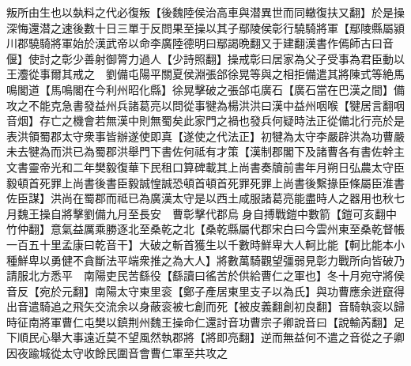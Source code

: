 叛所由生也以埶料之代必復叛【後魏陸侯治高車與潜異世而同轍復扶又翻】於是操深悔還潜之速後數十日三單于反問果至操以其子鄢陵侯彰行驍騎將軍【鄢陵縣屬潁川郡驍騎將軍始於漢武帝以命李廣陸德明曰鄢謁晩翻又于建翻漢書作傿師古曰音偃】使討之彰少善射御膂力過人【少詩照翻】操戒彰曰居家為父子受事為君臣動以王灋從事爾其戒之　劉備屯陽平關夏侯淵張郃徐晃等與之相拒備遣其將陳式等絶馬鳴閣道【馬鳴閣在今利州昭化縣】徐晃擊破之張郃屯廣石【廣石當在巴漢之間】備攻之不能克急書發益州兵諸葛亮以問從事犍為楊洪洪曰漢中益州咽喉【犍居言翻咽音烟】存亡之機會若無漢中則無蜀矣此家門之禍也發兵何疑時法正從備北行亮於是表洪領蜀郡太守衆事皆辦遂使即真【遂使之代法正】初犍為太守李嚴辟洪為功曹嚴未去犍為而洪已為蜀郡洪舉門下書佐何祗有才策【漢制郡閣下及諸曹各有書佐幹主文書靈帝光和二年樊毅復華下民租口算碑載其上尚書奏牘前書年月朔日弘農太守臣毅頓首死罪上尚書後書臣毅誠惶誠恐頓首頓首死罪死罪上尚書後繫掾臣條屬臣淮書佐臣謀】洪尚在蜀郡而祗已為廣漢太守是以西土咸服諸葛亮能盡時人之器用也秋七月魏王操自將擊劉備九月至長安　曹彰擊代郡烏身自搏戰鎧中數箭【鎧可亥翻中竹仲翻】意氣益厲乘勝逐北至桑乾之北【桑乾縣屬代郡宋白曰今雲州東至桑乾督帳一百五十里孟康曰乾音干】大破之斬首獲生以千數時鮮卑大人軻比能【軻比能本小種鮮卑以勇健不貪斷法平端衆推之為大人】將數萬騎觀望彊弱見彰力戰所向皆破乃請服北方悉平　南陽吏民苦繇役【繇讀曰徭苦於供給曹仁之軍也】冬十月宛守將侯音反【宛於元翻】南陽太守東里衮【鄭子產居東里支子以為氏】與功曹應余迸竄得出音遣騎追之飛矢交流余以身蔽衮被七創而死【被皮義翻創初良翻】音騎執衮以歸時征南將軍曹仁屯樊以鎮荆州魏王操命仁還討音功曹宗子卿說音曰【說輸芮翻】足下順民心舉大事遠近莫不望風然執郡將【將即亮翻】逆而無益何不遣之音從之子卿因夜踰城從太守收餘民圍音會曹仁軍至共攻之

